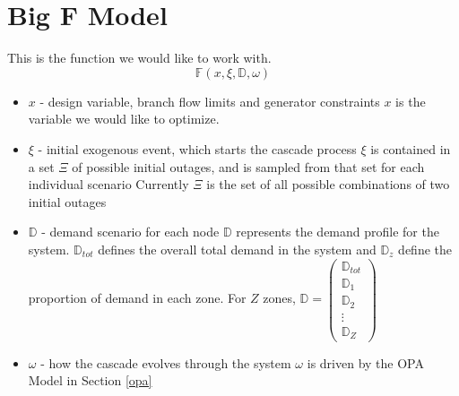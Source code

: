 \section{Big F Model}\label{big f}
This is the function we would like to work with.
\begin{equation}\label{f}
  \mathbb{F} \left( x, \xi, \mathbb{D}, \omega \right)
\end{equation}
\begin{itemize}
\item $x$ - design variable, branch flow limits and generator constraints \newline
 $x$ is the variable we would like to optimize.
\item $\xi$ - initial exogenous event, which starts the cascade process \newline
 $\xi$ is contained in a set $\Xi$ of possible initial outages, and is sampled from that set for each individual scenario \newline
 Currently $\Xi$ is the set of all possible combinations of two initial outages 
\item $\mathbb{D}$ - demand scenario for each node \newline
 $\mathbb{D}$ represents the demand profile for the system.  $\mathbb{D}_{tot}$ defines the overall total demand in the system and $\mathbb{D}_z$ define the proportion of demand in each zone.  \newline
 For $Z$ zones, \newline
$\mathbb{D} = 
 \left( 
	\begin{array}{lr}
				\mathbb{D}_{tot} \\
				\mathbb{D}_{1} \\
				\mathbb{D}_{2} \\
				\vdots \\
				\mathbb{D}_{Z} 
	\end{array}
 \right) $ \newline

\item $\omega$ - how the cascade evolves through the system \newline
 $\omega$ is driven by the OPA Model in Section \ref{opa} 
\end{itemize}



